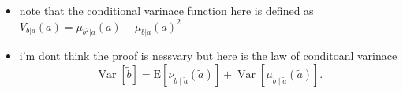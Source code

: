 \documentclass[10pt]{article}
\begin{document}
\begin{itemize}
    \item note that the conditional varinace function here is defined as $V_{b|a}(a)=\mu_{b^2|a}(a)-\mu_{b|a}(a)^2$
    \item i'm dont think the proof is nessvary but here is the law of conditoanl varinace $$
\operatorname{Var}[\tilde{b}]=\mathrm{E}\left[\nu_{\tilde{b} \mid \tilde{a}}(\tilde{a})\right]+\operatorname{Var}\left[\mu_{\tilde{b} \mid \tilde{a}}(\tilde{a})\right] .
$$

\end{itemize}
\end{document}
